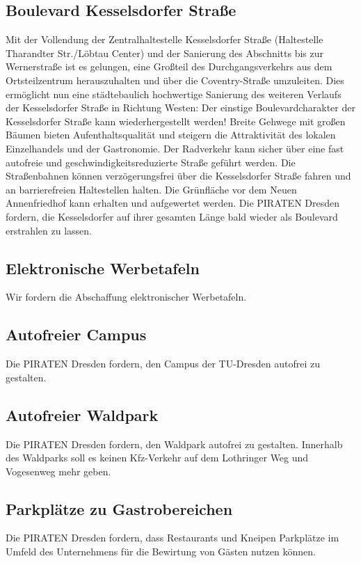 \documentclass[a4paper, 11pt]{article}
\begin{document}
\subsection{Boulevard Kesselsdorfer Straße}
Mit der Vollendung der Zentralhaltestelle Kesselsdorfer Straße (Haltestelle Tharandter Str./Löbtau Center) und der Sanierung des Abschnitts bis zur Wernerstraße ist es gelungen, eine Großteil des Durchgangsverkehrs aus dem Ortsteilzentrum herauszuhalten und über die Coventry-Straße umzuleiten. Dies ermöglicht nun eine städtebaulich hochwertige Sanierung des weiteren Verlaufs der Kesselsdorfer Straße in Richtung Westen: Der einstige Boulevardcharakter der Kesselsdorfer Straße kann wiederhergestellt werden! Breite Gehwege mit großen Bäumen bieten Aufenthaltsqualität und steigern die Attraktivität des lokalen Einzelhandels und der Gastronomie. Der Radverkehr kann sicher über eine fast autofreie und geschwindigkeitsreduzierte Straße geführt werden. Die Straßenbahnen können verzögerungsfrei über die Kesselsdorfer Straße fahren und an barrierefreien Haltestellen halten. Die Grünfläche vor dem Neuen Annenfriedhof kann erhalten und aufgewertet werden. Die PIRATEN Dresden fordern, die Kesselsdorfer auf ihrer gesamten Länge bald wieder als Boulevard erstrahlen zu lassen.


\subsection{Elektronische Werbetafeln}
Wir fordern die Abschaffung elektronischer Werbetafeln.



\subsection{Autofreier Campus}
Die PIRATEN Dresden fordern, den Campus der TU-Dresden autofrei zu gestalten.


\subsection{Autofreier Waldpark}
Die PIRATEN Dresden fordern, den Waldpark autofrei zu gestalten. Innerhalb des Waldparks soll es keinen Kfz-Verkehr auf dem Lothringer Weg und Vogesenweg mehr geben.


\subsection{Parkplätze zu Gastrobereichen}
Die PIRATEN Dresden fordern, dass Restaurants und Kneipen Parkplätze im Umfeld des Unternehmens für die Bewirtung von Gästen nutzen können.
\end{document}
